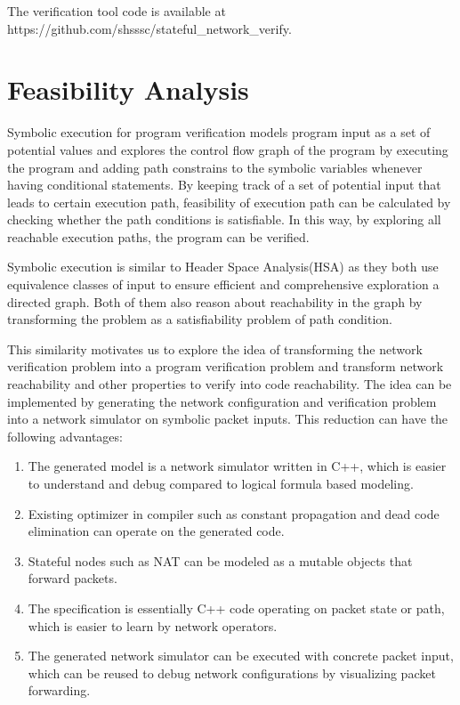 \documentclass[letterpaper, 10 pt, conference]{ieeeconf}  %
\begin{document}
The verification tool code is available at https://github.com/shsssc/stateful_network_verify.

\section{Feasibility Analysis}\label{sec:feasibility}

Symbolic execution for program verification models program input as a set of potential values and explores the control flow graph of the program by executing the program and adding path constrains to the symbolic variables whenever having conditional statements. By keeping track of a set of potential input that leads to certain execution path, feasibility of  execution path can be calculated by checking whether the path conditions is satisfiable. In this way, by exploring all reachable execution paths, the program can be verified.

Symbolic execution is similar to Header Space Analysis(HSA) as they both use equivalence classes of input to ensure efficient and comprehensive exploration a directed graph. Both of them also reason about reachability in the graph by transforming the problem as a satisfiability problem of path condition.

This similarity motivates us to explore the idea of transforming the network verification problem into a program verification problem and transform network reachability and other properties to verify into code reachability. 
The idea can be implemented by generating the network configuration and verification problem into a network simulator on symbolic packet inputs. This reduction can have the following advantages:

\begin{enumerate}
  \item The generated model is a network simulator written in C++, which is easier to understand and debug compared to logical formula based modeling.
  \item Existing optimizer in compiler such as constant propagation and dead code elimination can operate on the generated code.
  \item Stateful nodes such as NAT can be modeled as a mutable objects that forward packets.
  \item The specification is essentially C++ code operating on packet state or path, which is easier to learn by network operators.
  \item The generated network simulator can be executed with concrete packet input, which can be reused to debug network configurations by visualizing packet forwarding.
\end{enumerate}
\end{document}
